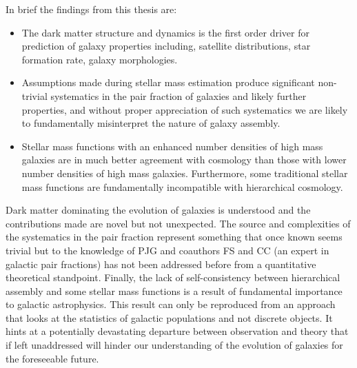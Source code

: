 In brief the findings from this thesis are: 
\begin{itemize}
    \item The dark matter structure and dynamics is the first order driver for prediction of galaxy properties including, satellite distributions, star formation rate, galaxy morphologies. 
    \item Assumptions made during stellar mass estimation produce significant non-trivial systematics in the pair fraction of galaxies and likely further properties, and without proper appreciation of such systematics we are likely to fundamentally misinterpret the nature of galaxy assembly. 
    \item Stellar mass functions with an enhanced number densities of high mass galaxies are in much better agreement with \LCDM cosmology than those with lower number densities of high mass galaxies. Furthermore, some traditional stellar mass functions are fundamentally incompatible with \LCDM hierarchical cosmology.
\end{itemize}

Dark matter dominating the evolution of galaxies is understood and the contributions made are novel but not unexpected. The source and complexities of the systematics in the pair fraction represent something that once known seems trivial but to the knowledge of PJG and coauthors FS and CC (an expert in galactic pair fractions) has not been addressed before from a quantitative theoretical standpoint. Finally, the lack of self-consistency between hierarchical \LCDM assembly and some stellar mass functions is a result of fundamental importance to galactic astrophysics. This result can only be reproduced from an approach that looks at the statistics of galactic populations and not discrete objects. It hints at a potentially devastating departure between observation and theory that if left unaddressed will hinder our understanding of the evolution of galaxies for the foreseeable future.
